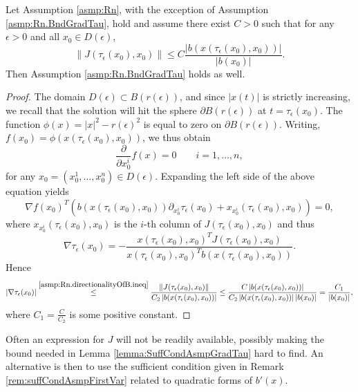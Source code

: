\documentclass[a4paper, oneside, reqno]{amsart}
\newcommand{\abs}[1]{\left\lvert#1\right\rvert}
\newcommand{\norm}[1]{\left\|#1\right\|}
\theoremstyle{remark}
\begin{document}
\begin{lemma}
\label{lemma:SuffCondAsmpGradTau}
    Let Assumption \ref{asmp:Rn}, with the exception of Assumption \ref{asmp:Rn.BndGradTau}, hold and assume there exist \(C > 0\) such that for any $\epsilon>0$ and all $x_0\in D(\epsilon)$, 
    \[
    \norm{J(\tau_\epsilon(x_0), x_0)} \leq C\frac{\abs{b(x(\tau_\epsilon(x_0), x_0))}}{\abs{b(x_0)}}. 
    \]
    Then Assumption \ref{asmp:Rn.BndGradTau} holds as well. 
\end{lemma}
\begin{proof}
    The domain $D(\epsilon) \subset B(r(\epsilon))$, and since $|x(t)|$ is strictly increasing, we recall that the solution will hit the sphere $\partial B(r(\epsilon))$ at 
    $t = \tau_\epsilon(x_0)$. The function \(\phi(x) = \abs{x}^2-r(\epsilon)^2\) 
    is equal to zero on $\partial B(r(\epsilon))$. Writing, 
    $f(x_0) = \phi(x(\tau_\epsilon(x_0), x_0))$, we thus obtain 
    \[
    \frac{\partial}{\partial x_0^i}f(x) = 
    0 \qquad i =1,\ldots, n,
    \]
    for any $x_0 = (x_0^1,\ldots, x_0^n) \in D(\epsilon)$. Expanding the left side of the above equation yields 
    \[\nabla f(x_0)^T\left( b(x(\tau_\epsilon(x_0), x_0)) \partial _{x_0^i}\tau_\epsilon(x_0) + x_{x_0^i}(\tau_\epsilon(x_0), x_0)\right) = 0, \]
    where \(x_{x_0^i}(\tau_\epsilon(x_0), x_0)\) is the \(i\)-th column of \(J(\tau_\epsilon(x_0), x_0)\)
    and thus
    \begin{equation}
    \label{eq:gradTauDir}
        \nabla\tau_\epsilon(x_0) = -\frac{x(\tau_\epsilon(x_0), x_0)^T J(\tau_\epsilon(x_0), x_0)}{x(\tau_\epsilon(x_0), x_0)^T  b(x(\tau_\epsilon(x_0), x_0))}.
    \end{equation}
    Hence 
    \begin{equation*}
    \abs{\nabla\tau_\epsilon(x_0)} \stackrel{\ref{asmp:Rn.directionalityOfB.ineq}}{\leq} \frac{\norm{J(\tau_\epsilon(x_0), x_0)}}    {C_2\abs{b(x(\tau_\epsilon(x_0), x_0))}} \leq \frac{C\abs{b(x(\tau_\epsilon(x_0), x_0))}}{C_2\abs{b(x(\tau_\epsilon(x_0), x_0))}\abs{b(x_0)}} = \frac{C_1}{\abs{b(x_0)}},
    \end{equation*}
    where \(C_1 = \frac{C}{C_2}\) is some positive constant. 
\end{proof}

Often an expression for \(J\) will not be readily available, possibly making the bound needed in Lemma \ref{lemma:SuffCondAsmpGradTau} hard to find.
An alternative is then to use the sufficient condition given in Remark \ref{rem:suffCondAsmpFirstVar} related to quadratic forms of \(b'(x)\).
\end{document}
